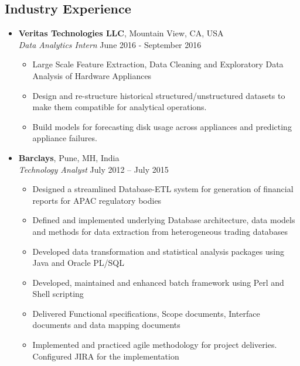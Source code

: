 \documentclass[10pt]{article}
\begin{document}
\subsection*{Industry Experience}
\begin{itemize}[leftmargin=*]
\item[] {\bfseries Veritas Technologies LLC}, Mountain View, CA, USA \\
{\sl Data Analytics Intern}  \hfill June 2016 - September 2016
\vspace{-0.25cm}
\begin{itemize}
\setlength{\itemsep}{0pt}%
\item Large Scale Feature Extraction, Data Cleaning and Exploratory Data Analysis of Hardware Appliances
\item Design and re-structure historical structured/unstructured datasets to make them compatible for analytical operations.
\item Build models for forecasting disk usage across appliances and predicting appliance failures.
\end{itemize}

\item[]  {\bfseries Barclays}, Pune, MH, India \\
{\sl Technology Analyst} \hfill July 2012 – July 2015
\vspace{-0.25cm}
\begin{itemize}
\setlength{\itemsep}{0pt}%
\item Designed a streamlined Database-ETL system for generation of financial reports for APAC regulatory bodies
\item Defined and implemented underlying Database architecture, data models and methods for data extraction from heterogeneous trading databases
\item Developed data transformation and statistical analysis packages using Java and Oracle PL/SQL
\item Developed, maintained and enhanced batch framework using Perl and Shell scripting
\item Delivered Functional specifications, Scope documents, Interface documents and data mapping documents
\item Implemented and practiced agile methodology for project deliveries. Configured JIRA for the implementation
\end{itemize}

\end{itemize}
\end{document}
